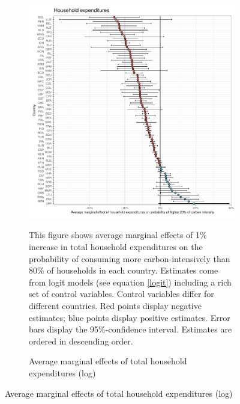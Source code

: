 \begin{figure}[ht!]
  \centering
  \caption{Average marginal effects (logit models)}\label{fig:Logit_ME}
  \begin{subfigure}[b]{\textwidth}
  \centering
  \includegraphics{1_Figures/Analysis_Logit_Models_Marginal_Effects/Average_Marginal_Effects_affected_upper_80_log_hh_expenditures_USD_2014_2017B.pdf}
  \caption{Average marginal effects of total household expenditures (log)} \label{fig:Logit_ME_exp}
  \begin{subcaption2}
     This figure shows average marginal effects of 1\% increase in total household expenditures on the probability of consuming more carbon-intensively than 80\% of households in each country. Estimates come from logit models (see equation \ref{logit}) including a rich set of control variables. Control variables differ for different countries. Red points display negative estimates; blue points display positive estimates. Error bars display the 95\%-confidence interval. Estimates are ordered in descending order.
  \end{subcaption2}
  \end{subfigure}
 \end{figure}
 \clearpage

